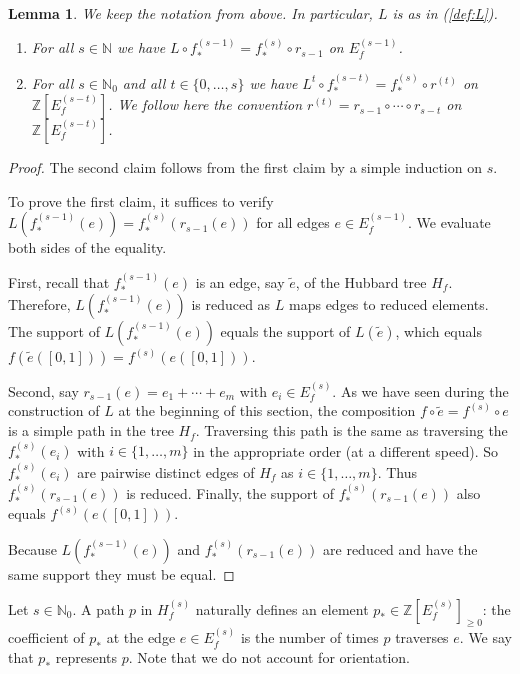 \documentclass[12pt,oneside,a4]{amsart}
\newcommand{\IN}{\mathbb{N}}
\newcommand{\IZ}{\mathbb{Z}}
\newcounter{maincounter}
\numberwithin{maincounter}{section}
\numberwithin{equation}{section}
\newtheorem{lemma}[maincounter]{Lemma}
\begin{document}
\begin{lemma}
  \label{lem:Lrcommutativediag}
  We keep the notation from above. In particular,  $L$ is as in (\ref{def:L}).
  \begin{enumerate}
  \item  [(i)] For all $s\in\IN$ we have $L\circ f_*^{(s-1)} =
    f_*^{(s)} \circ r_{s-1}$ on $E_f^{(s-1)}$.
  \item  [(ii)] For all $s\in\IN_0$ and all $t\in \{0,\ldots,s  \}$ we have
    $L^t \circ f_*^{(s-t)} = f_*^{(s)} \circ r^{(t)}$ on
  $\IZ[E_f^{(s-t)}]$.  We follow here the convention $r^{(t)} = r_{s-1}\circ \cdots \circ
  r_{s-t}$ on   $\IZ[E_f^{(s-t)}]$.
  \end{enumerate}
\end{lemma}
\begin{proof}
  The second claim follows from the first claim by a simple induction on $s$.
  
  To prove the first claim, it 
  suffices to verify $L(f_*^{(s-1)}(e)) = f_*^{(s)}(r_{s-1}(e))$ for all
  edges $e\in E_f^{(s-1)}$. We evaluate both sides of the equality.

  First, recall that $f_*^{(s-1)}(e)$ is an
  edge, say  $\widetilde e$,
  of the Hubbard tree $H_f$. Therefore, $L(f_*^{(s-1)}(e))$ is 
  reduced as $L$ maps
  edges to reduced elements. The support of $L(f_*^{(s-1)}(e))$ equals
  the support of $L(\widetilde e)$, which equals 
  $f(\widetilde e([0,1]))=f^{(s)}(e([0,1]))$.

  Second,
  say $r_{s-1}(e) = e_1+\cdots+e_m$ with $e_i\in E_f^{(s)}$.
  As we have seen
  during the construction of $L$ at the beginning of this section,
  the composition $f\circ \widetilde e
  = f^{(s)}\circ e$ is a
  simple path in the tree $H_f$. Traversing this path is the same as
  traversing the $f^{(s)}_*(e_i)$ with $i\in \{1,\ldots,m\}$ in the
  appropriate
  order (at a different
  speed). So $f^{(s)}_*(e_i)$ are pairwise distinct edges of $H_f$ as
  $i\in\{1,\ldots,m\}$. Thus $f^{(s)}_*(r_{s-1}(e))$ is reduced. 
  Finally, the support of $f_*^{(s)}(r_{s-1}(e))$ also equals
  $f^{(s)}(e([0,1]))$.

  Because $L(f_*^{(s-1)}(e))$ and $f_*^{(s)}(r_{s-1}(e))$ are reduced and
  have the same support they must be equal.   
\end{proof}

Let $s\in \IN_0$. 
A path $p$ in $H_f^{(s)}$ naturally defines an element $p_*\in
\IZ[E_f^{(s)}]_{\ge 0}$: the coefficient of $p_*$ at the edge $e\in
E_f^{(s)}$ is the number of times $p$ traverses $e$. We say that
$p_*$ represents $p$. Note that we do not account for orientation.
\end{document}
